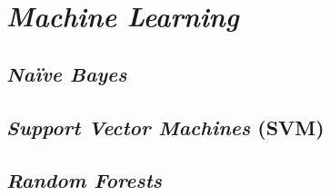 \section{\emph{Machine Learning}}

\subsection{\emph{Naïve Bayes}}

\subsection{\emph{Support Vector Machines} (SVM)}

\subsection{\emph{Random Forests}}